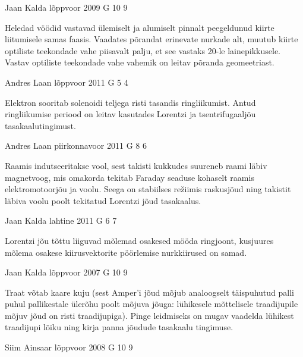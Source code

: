 \documentclass[11pt]{article}
\begin{document}
{%
{Jaan Kalda} %
{lõppvoor} %
{2009} %
{G 10} %
{9} %
{

\ifHint
Heledad vöödid vastavad ülemiselt ja alumiselt pinnalt peegeldunud kiirte liitumisele samas faasis. Vaadates põrandat erinevate nurkade alt, muutub kiirte optiliste teekondade vahe piisavalt palju, et see vastaks \num{20}-le lainepikkusele. Vastav optiliste teekondade vahe vahemik on leitav põranda geomeetriast.
\fi
}

{Andres Laan} %
{lõppvoor} %
{2011} %
{G 5} %
{4} %
{

\ifHint
Elektron sooritab solenoidi teljega risti tasandis ringliikumist. Antud ringliikumise periood on leitav kasutades Lorentzi ja tsentrifugaaljõu tasakaalutingimust.
\fi
}

{Andres Laan} %
{piirkonnavoor} %
{2011} %
{G 8} %
{6} %
{

\ifHint
Raamis indutseeritakse vool, sest takisti kukkudes suureneb raami läbiv magnetvoog, mis omakorda tekitab Faraday seaduse kohaselt raamis elektromotoorjõu ja voolu. Seega on stabiilses režiimis raskusjõud ning takistit läbiva voolu poolt tekitatud Lorentzi jõud tasakaalus.
\fi
}

{Jaan Kalda} %
{lahtine} %
{2011} %
{G 6} %
{7} %
{

\ifHint
Lorentzi jõu tõttu liiguvad mõlemad osakesed mööda ringjoont, kusjuures mõlema osakese kiirusvektorite pöörlemise nurkkiirused on samad.
\fi
}

{Jaan Kalda} %
{lõppvoor} %
{2007} %
{G 10} %
{9} %
{

\ifHint
Traat võtab kaare kuju (sest Amper’i jõud mõjub analoogselt täispuhutud palli puhul pallikestale ülerõhu poolt mõjuva jõuga: lühikesele mõttelisele traadijupile mõjuv jõud on risti traadijupiga). Pinge leidmiseks on mugav vaadelda lühikest traadijupi lõiku ning kirja panna jõudude tasakaalu tingimuse.
\fi
}

{Siim Ainsaar} %
{lõppvoor} %
{2008} %
{G 10} %
{9} %
{

}}
\end{document}
